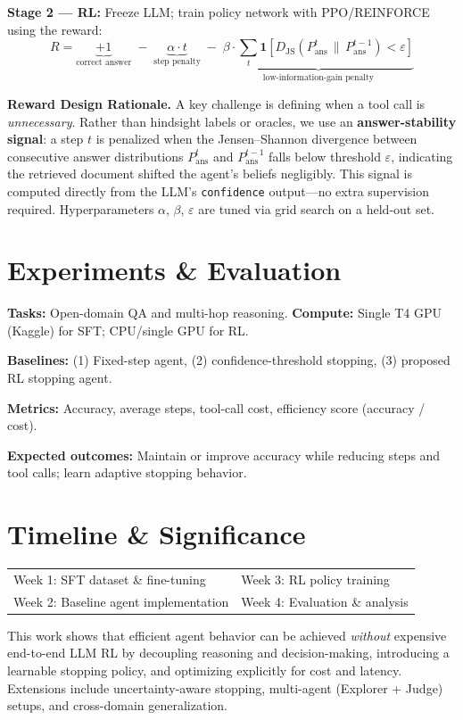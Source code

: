 \documentclass[10pt]{article}
\begin{document}
\textbf{Stage 2 --- RL:} Freeze LLM; train policy network with PPO/REINFORCE using the reward:
\[
R = \underbrace{+1}_{\text{correct answer}} \;-\; \underbrace{\alpha \cdot t}_{\text{step penalty}} \;-\; \underbrace{\beta \cdot \sum_{t} \mathbf{1}\!\left[D_{\mathrm{JS}}\!\left(P_{\mathrm{ans}}^{t} \,\|\, P_{\mathrm{ans}}^{t-1}\right) < \varepsilon\right]}_{\text{low-information-gain penalty}}
\]

\noindent\textbf{Reward Design Rationale.} A key challenge is defining when a tool call is \emph{unnecessary}. Rather than hindsight labels or oracles, we use an \textbf{answer-stability signal}: a step $t$ is penalized when the Jensen--Shannon divergence between consecutive answer distributions $P_{\mathrm{ans}}^{t}$ and $P_{\mathrm{ans}}^{t-1}$ falls below threshold $\varepsilon$, indicating the retrieved document shifted the agent's beliefs negligibly. This signal is computed directly from the LLM's \texttt{confidence} output---no extra supervision required. Hyperparameters $\alpha$, $\beta$, $\varepsilon$ are tuned via grid search on a held-out set.

\section*{Experiments \& Evaluation}

\textbf{Tasks:} Open-domain QA and multi-hop reasoning. \quad \textbf{Compute:} Single T4 GPU (Kaggle) for SFT; CPU/single GPU for RL.

\textbf{Baselines:} (1) Fixed-step agent, (2) confidence-threshold stopping, (3) proposed RL stopping agent.

\textbf{Metrics:} Accuracy, average steps, tool-call cost, efficiency score (accuracy / cost).

\textbf{Expected outcomes:} Maintain or improve accuracy while reducing steps and tool calls; learn adaptive stopping behavior.

\section*{Timeline \& Significance}

\begin{tabular}{@{}ll@{}}
Week 1: SFT dataset \& fine-tuning \quad & Week 3: RL policy training \\
Week 2: Baseline agent implementation \quad & Week 4: Evaluation \& analysis
\end{tabular}

This work shows that efficient agent behavior can be achieved \emph{without} expensive end-to-end LLM RL by decoupling reasoning and decision-making, introducing a learnable stopping policy, and optimizing explicitly for cost and latency. Extensions include uncertainty-aware stopping, multi-agent (Explorer + Judge) setups, and cross-domain generalization.
\end{document}
